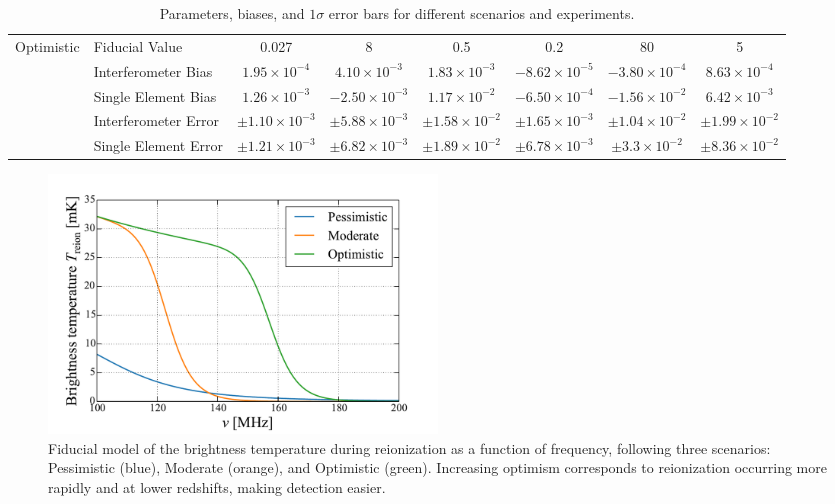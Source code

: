 \documentclass[twocolumn,apj,numberedappendix]{emulateapj}
\newcommand{\acl}[1]{}
\begin{document}
\begin{table}[htbp]
\begin{tabular}{@{} llcccccc @{}}
      \midrule
      Optimistic & Fiducial Value & 0.027 & 8 & 0.5 & 0.2 & 80 & 5 \\
      \cmidrule(l){2-8}
			 & Interferometer Bias & $1.95\times10^{-4}$ & $4.10\times10^{-3}$ & $1.83\times 10^{-3}$ & $-8.62\times 10^{-5}$ &$ -3.80\times 10^{-4}$ & $8.63\times 10^{-4}$ \\
			 & Single Element Bias & $1.26\times10^{-3}$ & $-2.50\times10^{-3}$ & $1.17 \times 10^{-2}$ & $-6.50\times10^{-4}$ & $-1.56 \times 10^{-2}$ & $6.42\times10^{-3}$ \\
      			 & Interferometer Error & $\pm 1.10 \times 10^{-3}$ & $\pm 5.88 \times 10^{-3}$ & $\pm 1.58\times 10^{-2}$ & $\pm 1.65\times 10^{-3}$ & $\pm 1.04\times 10^{-2}$ & $\pm 1.99\times 10^{-2}$ \\
      			 & Single Element Error  & $\pm 1.21 \times 10^{-3}$ & $\pm 6.82 \times 10^{-3}$ & $\pm 1.89 \times 10^{-2}$ & $\pm 6.78\times 10^{-3}$ & $\pm 3.3 \times 10^{-2}$ & $\pm 8.36 \times 10^{-2}$ \\
      \bottomrule
   \end{tabular}
   \caption{\acl{Need to check that I transcribed the new numbers correctly} Parameters, biases, and $1\sigma$ error bars for different scenarios and experiments.}
   \label{tab:params}
\end{table}

\begin{figure}[h]
	\centering
	\includegraphics[width=0.5\textwidth] {figures/reionScenarios.pdf}
	\caption{Fiducial model of the brightness temperature during reionization as a function of frequency, following three scenarios: Pessimistic (blue), Moderate (orange), and Optimistic (green). Increasing optimism corresponds to reionization occurring more rapidly and at lower redshifts, making detection easier.}
	\label{fig:reionScenarios}
\end{figure}
\end{document}
